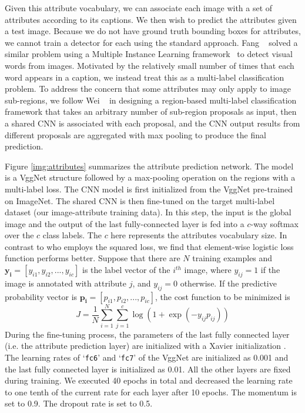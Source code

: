 Given this attribute vocabulary, we can associate each image with a set of attributes according to its captions. We then wish to predict the attributes given a test image. Because we do not have ground truth bounding boxes for attributes, we cannot train a detector for each using the standard approach. Fang \etal~\cite{fang2014captions} solved a similar problem using a Multiple Instance Learning framework~\cite{zhang2005multiple} to detect visual words from images. Motivated by the relatively small number of times that each word appears in a caption, we instead treat this as a multi-label classification problem. To address the concern that some attributes may only apply to image sub-regions, we follow Wei \etal~\cite{wei2014cnn} in designing a region-based multi-label classification framework that takes an arbitrary number of sub-region proposals as input, then a shared CNN is associated with each proposal, and the CNN output results from different proposals are aggregated with max pooling to produce the final prediction.

Figure \ref{img:attributes} summarizes the attribute prediction network. The model is a VggNet structure followed by a max-pooling operation on the regions with a multi-label loss. The CNN model is first initialized from the VggNet pre-trained on ImageNet.
%
The shared CNN is then fine-tuned on the target multi-label dataset (our image-attribute training data). In this step, the input is the global image and the output of the last fully-connected layer is fed into a $c$-way softmax over the $c$ class labels. The $c$ here represents the attributes vocabulary size. In contrast to \cite{wei2014cnn} who employs the squared loss, we find that element-wise logistic loss function performs better. Suppose that there are $N$ training examples and $\bm{y_i}=[y_{i1}, y_{i2},... , y_{ic}]$ is the label vector of the $i^{th}$ image, where $y_{ij}=1$ if the image is annotated with attribute $j$, and $y_{ij}=0$ otherwise. If the predictive probability vector is $\bm{p_i}=[p_{i1}, p_{i2},... , p_{ic}]$, the cost function to be minimized is
\begin{equation}
 J=\frac{1}{N}\sum_{i=1}^{N}\sum_{j=1}^{c}\log(1+\exp(-y_{ij}p_{ij}))
\end{equation}
During the fine-tuning process, the parameters of the last fully connected layer (i.e. the attribute prediction layer) are initialized with a Xavier initialization \cite{glorot2010understanding}. The learning rates of  `\texttt{fc6}' and `\texttt{fc7}' of the VggNet are initialized as 0.001 and the last fully connected layer is initialized as 0.01. All the other layers are fixed during training. We executed 40 epochs in total and decreased the learning rate to one tenth of the current rate for each layer after 10 epochs. The momentum is set to 0.9. The dropout rate is set to 0.5.

